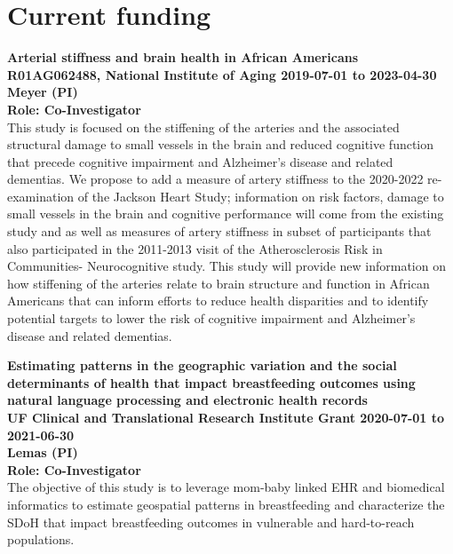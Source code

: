 \documentclass[10pt,letterpaper]{article}
\renewenvironment{itemize}{
  \begin{list}{}{
    \setlength{\leftmargin}{1.5em}
    \setlength{\itemsep}{0.25em}
    \setlength{\parskip}{0pt}
    \setlength{\parsep}{0.25em}
  }
}{
  \end{list}
}
\begin{document}
\section*{Current funding}
\begin{itemize}
    \item \textbf{Arterial stiffness and brain health in African Americans \\ R01AG062488, National Institute of Aging 2019-07-01 to 2023-04-30 \\
    Meyer (PI)\\
    Role: Co-Investigator}\\
    This study is focused on the stiffening of the arteries and the associated structural damage to small vessels in the brain and reduced cognitive function that precede cognitive impairment and Alzheimer's disease and related dementias. We propose to add a measure of artery stiffness to the 2020-2022 re-examination of the Jackson Heart Study; information on risk factors, damage to small vessels in the brain and cognitive performance will come from the existing study and as well as measures of artery stiffness in subset of participants that also participated in the 2011-2013 visit of the Atherosclerosis Risk in Communities- Neurocognitive study. This study will provide new information on how stiffening of the arteries relate to brain structure and function in African Americans that can inform efforts to reduce health disparities and to identify potential targets to lower the risk of cognitive impairment and Alzheimer's disease and related dementias.\\
    
    \item \textbf{Estimating patterns in the geographic variation and the social determinants of health that impact breastfeeding outcomes using natural language processing and electronic health records \\ UF Clinical and Translational Research Institute Grant 2020-07-01 to 2021-06-30\\ 
    Lemas (PI) \\
    Role: Co-Investigator} \\
The objective of this study is to leverage mom-baby linked EHR and biomedical informatics to estimate geospatial patterns in breastfeeding and characterize the SDoH that impact breastfeeding outcomes in vulnerable and hard-to-reach populations.
\end{itemize}
\end{document}
